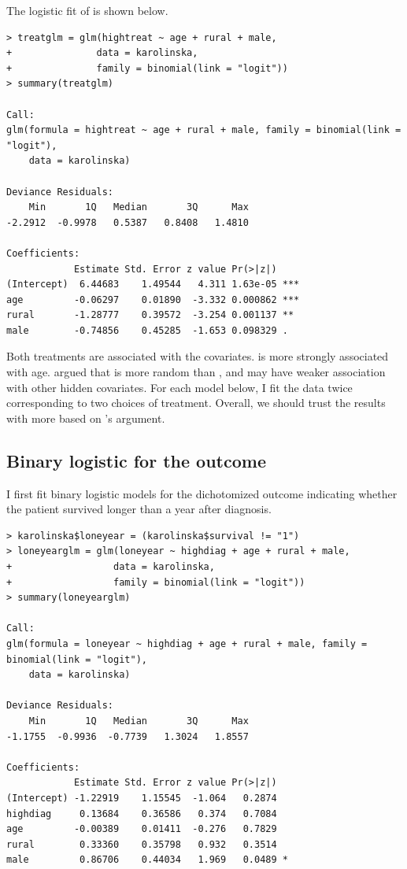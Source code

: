 The logistic fit of  is shown below.

\begin{lstlisting}
> treatglm = glm(hightreat ~ age + rural + male, 
+               data = karolinska, 
+               family = binomial(link = "logit"))
> summary(treatglm)

Call:
glm(formula = hightreat ~ age + rural + male, family = binomial(link = "logit"), 
    data = karolinska)

Deviance Residuals: 
    Min       1Q   Median       3Q      Max  
-2.2912  -0.9978   0.5387   0.8408   1.4810  

Coefficients:
            Estimate Std. Error z value Pr(>|z|)    
(Intercept)  6.44683    1.49544   4.311 1.63e-05 ***
age         -0.06297    0.01890  -3.332 0.000862 ***
rural       -1.28777    0.39572  -3.254 0.001137 ** 
male        -0.74856    0.45285  -1.653 0.098329 .  
\end{lstlisting}


Both treatments are associated with the covariates.  is more strongly associated with age.   \citet{rubin2008objective} argued that  is more random than  , and may have weaker association with other hidden covariates. For each model below, I fit the data twice corresponding to two choices of treatment.  Overall, we should trust the results with  more based on \citet{rubin2008objective}'s argument. 

 

\subsection{Binary logistic for the outcome}


I first fit binary logistic models for the dichotomized outcome indicating whether the patient survived longer than a year after diagnosis. 

\begin{lstlisting}
> karolinska$loneyear = (karolinska$survival != "1")
> loneyearglm = glm(loneyear ~ highdiag + age + rural + male,
+                  data = karolinska, 
+                  family = binomial(link = "logit"))
> summary(loneyearglm)

Call:
glm(formula = loneyear ~ highdiag + age + rural + male, family = binomial(link = "logit"), 
    data = karolinska)

Deviance Residuals: 
    Min       1Q   Median       3Q      Max  
-1.1755  -0.9936  -0.7739   1.3024   1.8557  

Coefficients:
            Estimate Std. Error z value Pr(>|z|)  
(Intercept) -1.22919    1.15545  -1.064   0.2874  
highdiag     0.13684    0.36586   0.374   0.7084  
age         -0.00389    0.01411  -0.276   0.7829  
rural        0.33360    0.35798   0.932   0.3514  
male         0.86706    0.44034   1.969   0.0489 *
\end{lstlisting}

